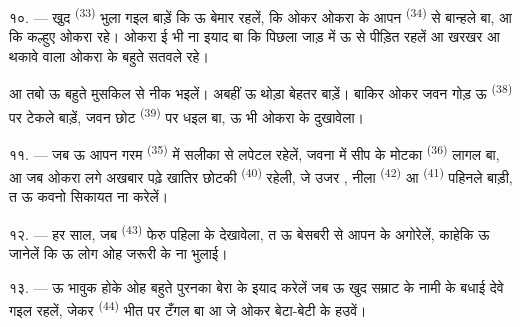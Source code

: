 \VUsaut{4.2mm}
\VUsaut{3.0mm}

१०. --- खुद  \textsuperscript{(33)} भुला गइल बाड़ें कि ऊ
बेमार रहलें, कि ओकर  ओकरा के आपन 
\textsuperscript{(34)} से बान्हले बा, आ कि कल्हुए ओकरा  रहे। ओकरा ई भी ना इयाद बा कि पिछला जाड़ में ऊ 
से पीड़ित रहलें आ खरखर आ थकावे वाला  ओकरा के बहुते सतवले
रहे।

आ तबो ऊ बहुते मुसकिल से नीक भइलें। अबहीं ऊ थोड़ा बेहतर बाड़ें। बाकिर ओकर
जवन गोड़ ऊ  \textsuperscript{(38)} पर टेकले बाड़ें, जवन छोट
 \textsuperscript{(39)} पर धइल बा, ऊ भी ओकरा के दुखावेला।

११. --- जब ऊ आपन गरम  \textsuperscript{(35)} में
सलीका से लपेटल रहेलें, जवना में सीप के मोटका 
\textsuperscript{(36)} लागल बा, आ जब ओकरा लगे अखबार पढ़े खातिर छोटकी
 \textsuperscript{(40)} रहेली, जे उजर ,
नीला  \textsuperscript{(42)} आ 
\textsuperscript{(41)} पहिनले बाड़ी, त ऊ कवनो सिकायत ना करेलें।

१२. --- हर साल, जब  \textsuperscript{(43)} फेरु पहिला
 के  देखावेला, त ऊ बेसबरी से आपन
 के अगोरेलें, काहेकि ऊ जानेलें कि ऊ लोग ओह जरूरी
 के ना भुलाई।

१३. --- ऊ भावुक होके ओह बहुते पुरनका बेरा के इयाद करेलें जब ऊ खुद
सम्राट के नामी  के बधाई देवे गइल रहलें, जेकर
 \textsuperscript{(44)} भीत पर टँगल बा आ जे ओकर बेटा-बेटी
के  हउवें।
